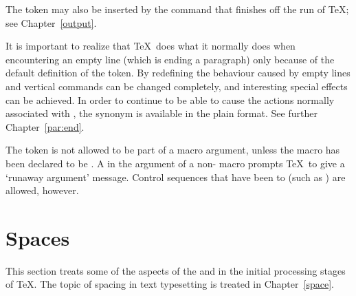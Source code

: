 \documentclass{book}
\begin{document}
The  token may also be inserted by the 
command that finishes off the run of \TeX; see Chapter~\ref{output}.

It is important to realize that \TeX\ does what it normally does
when encountering an empty line
(which is ending a paragraph)
only because of the default definition of the  token.
By redefining  the behaviour
caused by empty lines and vertical commands can be changed completely,
and  interesting special effects can be achieved.
In order to continue to be able  to cause the actions normally
associated with , the synonym  is
available in the plain format. See further Chapter~\ref{par:end}.

The  token is not allowed to be part of a macro
argument, unless the macro has been declared to be .
A  in the argument of a non- macro
prompts \TeX\ to give a `runaway argument' message.
Control sequences that have been  to 
(such as ) are allowed, however.

\section{Spaces}

This section treats some of the aspects of the
 and  in the
initial processing stages of \TeX. The topic of spacing in text
typesetting is treated in Chapter~\ref{space}.
\end{document}
